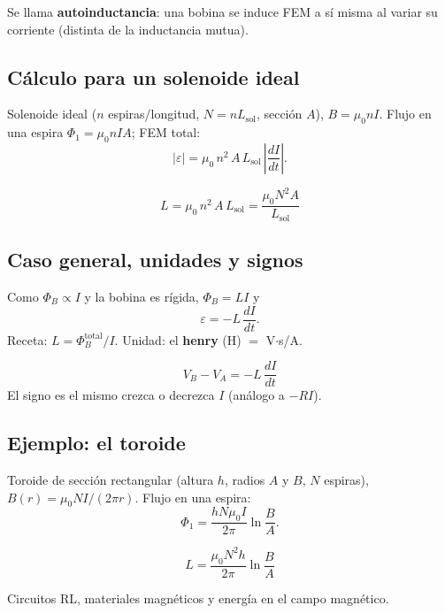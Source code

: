 \documentclass[12pt,a4paper]{article}
\begin{document}
Se llama \textbf{autoinductancia}: una bobina se induce FEM a sí misma al
variar su corriente (distinta de la inductancia mutua).

\subsection{Cálculo para un solenoide ideal}

Solenoide ideal ($n$ espiras/longitud, $N = n L_{\text{sol}}$, sección $A$),
$B = \mu_0 n I$. Flujo en una espira $\Phi_1 = \mu_0 n I A$; FEM total:
\[
|\varepsilon| = \mu_0\, n^2\, A\, L_{\text{sol}}\,\left|\frac{dI}{dt}\right|.
\]

\begin{keybox}
  \[
  \boxed{L = \mu_0\, n^2\, A\, L_{\text{sol}} = \frac{\mu_0 N^2 A}{L_{\text{sol}}}}
  \]
\end{keybox}

\subsection{Caso general, unidades y signos}

Como $\Phi_B \propto I$ y la bobina es rígida, $\Phi_B = L I$ y
\[
\varepsilon = -L\,\frac{dI}{dt}.
\]
Receta: $L = \Phi_B^{\text{total}}/I$. Unidad: el \textbf{henry} (H) $=$
V$\cdot$s/A.

\begin{keybox}
  \[
  \boxed{V_B - V_A = -L\,\frac{dI}{dt}}
  \]
  El signo es el mismo crezca o decrezca $I$ (análogo a $-RI$).
\end{keybox}

\subsection{Ejemplo: el toroide}

Toroide de sección rectangular (altura $h$, radios $A$ y $B$, $N$ espiras),
$B(r) = \mu_0 N I/(2\pi r)$. Flujo en una espira:
\[
\Phi_1 = \frac{h N \mu_0 I}{2\pi}\ln\!\frac{B}{A}.
\]

\begin{keybox}
  \[
  \boxed{L = \frac{\mu_0 N^2 h}{2\pi}\ln\!\frac{B}{A}}
  \]
\end{keybox}

\begin{notebox}
  Circuitos RL, materiales magnéticos y energía en el campo magnético.
\end{notebox}
\end{document}
